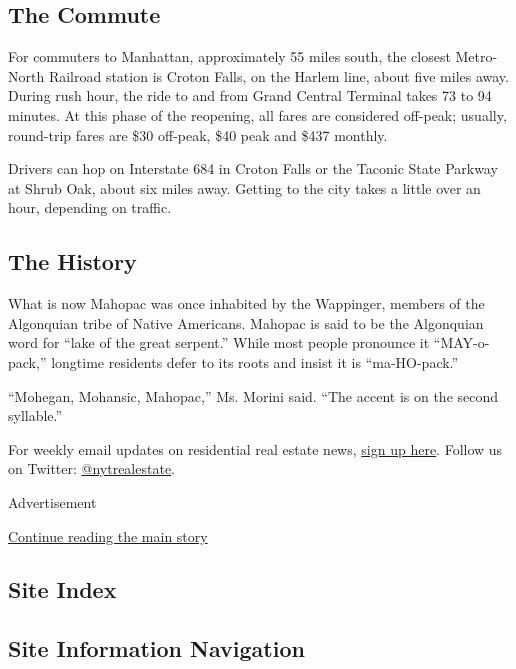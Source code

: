 \hypertarget{the-commute}{%
\subsection{The Commute}\label{the-commute}}

For commuters to Manhattan, approximately 55 miles south, the closest
Metro-North Railroad station is Croton Falls, on the Harlem line, about
five miles away. During rush hour, the ride to and from Grand Central
Terminal takes 73 to 94 minutes. At this phase of the reopening, all
fares are considered off-peak; usually, round-trip fares are \$30
off-peak, \$40 peak and \$437 monthly.

Drivers can hop on Interstate 684 in Croton Falls or the Taconic State
Parkway at Shrub Oak, about six miles away. Getting to the city takes a
little over an hour, depending on traffic.

\hypertarget{the-history}{%
\subsection{The History}\label{the-history}}

What is now Mahopac was once inhabited by the Wappinger, members of the
Algonquian tribe of Native Americans. Mahopac is said to be the
Algonquian word for ``lake of the great serpent.'' While most people
pronounce it ``MAY-o-pack,'' longtime residents defer to its roots and
insist it is ``ma-HO-pack.''

``Mohegan, Mohansic, Mahopac,'' Ms. Morini said. ``The accent is on the
second syllable.''

For weekly email updates on residential real estate news,
\href{http://www.nytimes.com/newsletters/realestate/}{sign up here}.
Follow us on Twitter:
\href{https://twitter.com/nytrealestate}{@nytrealestate}.

Advertisement

\protect\hyperlink{after-bottom}{Continue reading the main story}

\hypertarget{site-index}{%
\subsection{Site Index}\label{site-index}}

\hypertarget{site-information-navigation}{%
\subsection{Site Information
Navigation}\label{site-information-navigation}}

